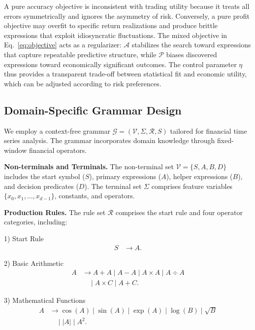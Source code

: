 A pure accuracy objective is inconsistent with trading utility because it treats all errors symmetrically and ignores the asymmetry of risk. Conversely, a pure profit objective may overfit to specific return realizations and produce brittle expressions that exploit idiosyncratic fluctuations. The mixed objective in Eq.~\ref{eq:objective} acts as a regularizer: $\mathcal{A}$ stabilizes the search toward expressions that capture repeatable predictive structure, while $\mathcal{P}$ biases discovered expressions toward economically significant outcomes. The control parameter $\eta$ thus provides a transparent trade-off between statistical fit and economic utility, which can be adjusted according to risk preferences.

\subsection{Domain-Specific Grammar Design}
\label{subsec:grammar}

We employ a context-free grammar $\mathcal{G} = (\mathcal{V}, \Sigma, \mathcal{R}, \mathit{S})$ tailored for financial time series analysis. The grammar incorporates domain knowledge through fixed-window financial operators.

\textbf{Non-terminals and Terminals.} The non-terminal set $\mathcal{V} = \{\mathit{S}, \mathit{A}, \mathit{B}, \mathit{D}\}$ includes the start symbol ($\mathit{S}$), primary expressions ($\mathit{A}$), helper expressions ($\mathit{B}$), and decision predicates ($\mathit{D}$). The terminal set $\Sigma$ comprises feature variables $\{x_0, x_1, \ldots, x_{d-1}\}$, constants, and operators.

\textbf{Production Rules.} The rule set $\mathcal{R}$ comprises the start rule and four operator categories, including:

1) Start Rule
\begin{align}
\mathit{S} &\rightarrow \mathit{A}.
\end{align}

2) Basic Arithmetic
\begin{align}
\mathit{A} &\rightarrow \mathit{A} + \mathit{A} \mid \mathit{A} - \mathit{A} \mid \mathit{A} \times \mathit{A} \mid \mathit{A} \div \mathit{A} \nonumber \\
&\quad \mid \mathit{A} \times C \mid \mathit{A} + C.
\end{align}

3) Mathematical Functions
\begin{align}
\mathit{A} &\rightarrow \cos(\mathit{A}) \mid \sin(\mathit{A}) \mid \exp(\mathit{A}) \mid \log(\mathit{B}) \mid \sqrt{\mathit{B}} \nonumber \\
&\quad \mid |\mathit{A}| \mid \mathit{A}^{2}.
\end{align}

